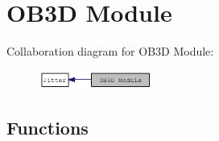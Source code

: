 \hypertarget{group__ob3dmod}{
\section{OB3D Module}
\label{group__ob3dmod}
}


Collaboration diagram for OB3D Module:\nopagebreak
\begin{figure}[H]
\begin{center}
\leavevmode
\includegraphics[width=106pt]{group__ob3dmod}
\end{center}
\end{figure}
\subsection*{Functions}

